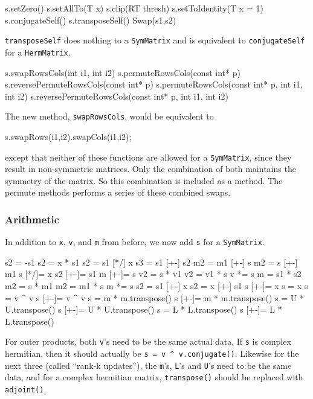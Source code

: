 \documentclass[twoside,letterpaper,11pt]{article}
\renewcommand{\tt}[1]{{\lstinline {#1}}}
\begin{document}
\begin{tmvcode}
s.setZero()
s.setAllTo(T x)
s.clip(RT thresh)
s.setToIdentity(T x = 1)
s.conjugateSelf()
s.transposeSelf()
Swap(s1,s2)
\end{tmvcode}
\tt{transposeSelf} does nothing to a \tt{SymMatrix} and is equivalent to
\tt{conjugateSelf} for a \tt{HermMatrix}.
\begin{tmvcode}
s.swapRowsCols(int i1, int i2)
s.permuteRowsCols(const int* p)
s.reversePermuteRowsCols(const int* p)
s.permuteRowsCols(const int* p, int i1, int i2)
s.reversePermuteRowsCols(const int* p, int i1, int i2)
\end{tmvcode}
The new method, \tt{swapRowsCols}, would be equivalent to 
\begin{tmvcode}
s.swapRows(i1,i2).swapCols(i1,i2);
\end{tmvcode}
except that neither of these functions are allowed for a \tt{SymMatrix}, since 
they result in non-symmetric matrices.  Only the combination of both
maintains the symmetry of the matrix.  So this combination is included as
a method.  The permute methods performs a series of these
combined swaps.
\vspace{12pt}

\subsubsection{Arithmetic}
\label{symarith}

In addition to \tt{x}, \tt{v}, and \tt{m} from before,
we now add \tt{s} for a \tt{SymMatrix}.

\begin{tmvcode}
s2 = -s1
s2 = x * s1
s2 = s1 [*/] x
s3 = s1 [+-] s2
m2 = m1 [+-] s
m2 = s [+-] m1
s [*/]= x
s2 [+-]= s1
m [+-]= s
v2 = s * v1
v2 = v1 * s
v *= s
m = s1 * s2
m2 = s * m1
m2 = m1 * s
m *= s
s2 = s1 [+-] x
s2 = x [+-] s1
s [+-]= x
s = x
s = v ^ v
s [+-]= v ^ v
s = m * m.transpose()
s [+-]= m * m.transpose()
s = U * U.transpose()
s [+-]= U * U.transpose()
s = L * L.transpose()
s [+-]= L * L.transpose()
\end{tmvcode}
For outer products, both \tt{v}'s need to be the same actual data.  If \tt{s}
is complex hermitian, then it should actually be 
\tt{s = v ^ v.conjugate()}.
Likewise for the next three (called ``rank-k updates''), the \tt{m}'s, \tt{L}'s and
\tt{U}'s need to be the
same data, and for a complex hermitian matrix, \tt{transpose()}
should be replaced with \tt{adjoint()}.
\end{document}
